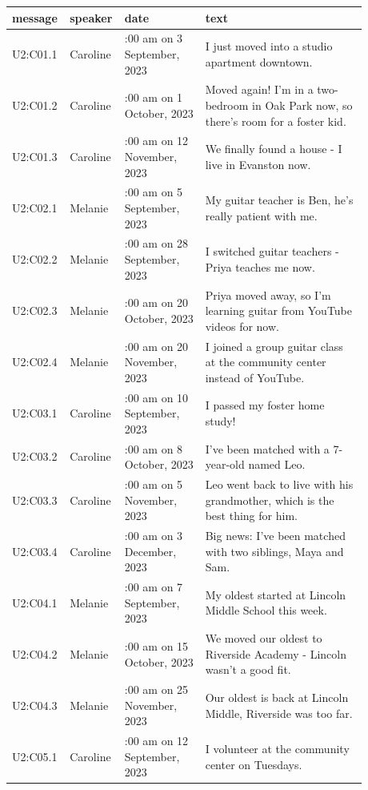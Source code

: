 \documentclass[11pt]{article}
\begin{document}
\begingroup\scriptsize
\begin{longtable}{>{\raggedright\arraybackslash}p{0.105\linewidth}>{\raggedright\arraybackslash}p{0.105\linewidth}>{\raggedright\arraybackslash}p{0.225\linewidth}>{\raggedright\arraybackslash}p{0.449\linewidth}}
\toprule
\textbf{message} & \textbf{speaker} & \textbf{date} & \textbf{text} \\
\midrule
\endhead
U2:C01.1 & Caroline & 11:00 am on 3 September, 2023 & I just moved into a studio apartment downtown. \\
U2:C01.2 & Caroline & 11:00 am on 1 October, 2023 & Moved again! I'm in a two-bedroom in Oak Park now, so there's room for a foster kid. \\
U2:C01.3 & Caroline & 11:00 am on 12 November, 2023 & We finally found a house - I live in Evanston now. \\
U2:C02.1 & Melanie & 11:00 am on 5 September, 2023 & My guitar teacher is Ben, he's really patient with me. \\
U2:C02.2 & Melanie & 11:00 am on 28 September, 2023 & I switched guitar teachers - Priya teaches me now. \\
U2:C02.3 & Melanie & 11:00 am on 20 October, 2023 & Priya moved away, so I'm learning guitar from YouTube videos for now. \\
U2:C02.4 & Melanie & 11:00 am on 20 November, 2023 & I joined a group guitar class at the community center instead of YouTube. \\
U2:C03.1 & Caroline & 11:00 am on 10 September, 2023 & I passed my foster home study! \\
U2:C03.2 & Caroline & 11:00 am on 8 October, 2023 & I've been matched with a 7-year-old named Leo. \\
U2:C03.3 & Caroline & 11:00 am on 5 November, 2023 & Leo went back to live with his grandmother, which is the best thing for him. \\
U2:C03.4 & Caroline & 11:00 am on 3 December, 2023 & Big news: I've been matched with two siblings, Maya and Sam. \\
U2:C04.1 & Melanie & 11:00 am on 7 September, 2023 & My oldest started at Lincoln Middle School this week. \\
U2:C04.2 & Melanie & 11:00 am on 15 October, 2023 & We moved our oldest to Riverside Academy - Lincoln wasn't a good fit. \\
U2:C04.3 & Melanie & 11:00 am on 25 November, 2023 & Our oldest is back at Lincoln Middle, Riverside was too far. \\
U2:C05.1 & Caroline & 11:00 am on 12 September, 2023 & I volunteer at the community center on Tuesdays. \\

\end{longtable}
\end{document}
